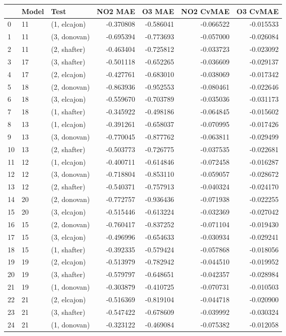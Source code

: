 \begin{tabular}{lllrrrr}
\toprule
{} & Model &          Test &   NO2 MAE &    O3 MAE &  NO2 CvMAE &  O3 CvMAE \\
\midrule
0  &    11 &  (1, elcajon) & -0.370808 & -0.586041 &  -0.066522 & -0.015533 \\
1  &    11 &  (3, donovan) & -0.695394 & -0.773693 &  -0.057000 & -0.026084 \\
2  &    11 &  (2, shafter) & -0.463404 & -0.725812 &  -0.033723 & -0.023092 \\
3  &    17 &  (3, shafter) & -0.501118 & -0.652265 &  -0.036609 & -0.029137 \\
4  &    17 &  (2, elcajon) & -0.427761 & -0.683010 &  -0.038069 & -0.017342 \\
5  &    18 &  (2, donovan) & -0.863936 & -0.952553 &  -0.080461 & -0.022646 \\
6  &    18 &  (3, elcajon) & -0.559670 & -0.703789 &  -0.035036 & -0.031173 \\
7  &    18 &  (1, shafter) & -0.345922 & -0.498186 &  -0.064845 & -0.015602 \\
8  &    13 &  (1, elcajon) & -0.391261 & -0.658037 &  -0.070995 & -0.017426 \\
9  &    13 &  (3, donovan) & -0.770045 & -0.877762 &  -0.063811 & -0.029499 \\
10 &    13 &  (2, shafter) & -0.503773 & -0.726775 &  -0.037535 & -0.022681 \\
11 &    12 &  (1, elcajon) & -0.400711 & -0.614846 &  -0.072458 & -0.016287 \\
12 &    12 &  (3, donovan) & -0.718804 & -0.853110 &  -0.059057 & -0.028672 \\
13 &    12 &  (2, shafter) & -0.540371 & -0.757913 &  -0.040324 & -0.024170 \\
14 &    20 &  (2, donovan) & -0.772757 & -0.936436 &  -0.071938 & -0.022255 \\
15 &    20 &  (3, elcajon) & -0.515446 & -0.613224 &  -0.032369 & -0.027042 \\
16 &    15 &  (2, donovan) & -0.760417 & -0.837252 &  -0.071104 & -0.019430 \\
17 &    15 &  (3, elcajon) & -0.496996 & -0.654633 &  -0.030934 & -0.029241 \\
18 &    15 &  (1, shafter) & -0.392335 & -0.579424 &  -0.057868 & -0.018056 \\
19 &    19 &  (2, elcajon) & -0.513979 & -0.782942 &  -0.044510 & -0.019952 \\
20 &    19 &  (3, shafter) & -0.579797 & -0.648651 &  -0.042357 & -0.028984 \\
21 &    19 &  (1, donovan) & -0.303879 & -0.410725 &  -0.070731 & -0.010503 \\
22 &    21 &  (2, elcajon) & -0.516369 & -0.819104 &  -0.044718 & -0.020900 \\
23 &    21 &  (3, shafter) & -0.547422 & -0.678609 &  -0.039992 & -0.030324 \\
24 &    21 &  (1, donovan) & -0.323122 & -0.469084 &  -0.075382 & -0.012058 \\
\bottomrule
\end{tabular}
